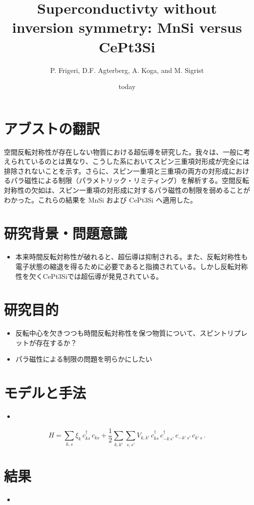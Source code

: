 \documentclass[a4paper,12pt]{jarticle}
\title{Superconductivty without inversion symmetry: MnSi versus CePt3Si}
\author{P. Frigeri, D.F. Agterberg, A. Koga, and M. Sigrist}
\date{today}
\begin{document}
\maketitle

\section*{アブストの翻訳}
空間反転対称性が存在しない物質における超伝導を研究した。我々は、一般に考えられているのとは異なり、こうした系においてスピン三重項対形成が完全には排除されないことを示す。さらに、スピン一重項と三重項の両方の対形成におけるパラ磁性による制限（パラメトリック・リミティング）を解析する。空間反転対称性の欠如は、スピン一重項の対形成に対するパラ磁性の制限を弱めることがわかった。これらの結果を MnSi および CePt3Si へ適用した。

\section*{研究背景・問題意識}
\begin{itemize}
    \item 本来時間反転対称性が破れると、超伝導は抑制される。また、反転対称性も電子状態の縮退を得るために必要であると指摘されている。しかし反転対称性を欠くCePt3Siでは超伝導が発見されている。
\end{itemize}

\section*{研究目的}
\begin{itemize}
    \item 反転中心を欠きつつも時間反転対称性を保つ物質について、スピントリプレットが存在するか？
    \item パラ磁性による制限の問題を明らかにしたい
\end{itemize}

\section*{モデルと手法}
\begin{itemize}
    \item 
\end{itemize}

\begin{equation}
    H
    = \sum_{k,s} \xi_k \, c_{ks}^\dagger \, c_{ks}
    + \frac{1}{2} \sum_{k,k'} \sum_{s,s'} V_{k,k'}
    \, c_{ks}^\dagger \, c_{-k\,s'}^\dagger 
    \, c_{-k'\,s'} \, c_{k'\,s}
    \,.
    \tag{1}
\end{equation}

\section*{結果}
\begin{itemize}
    \item 
\end{itemize}
\end{document}
